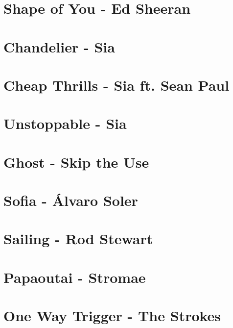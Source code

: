 \documentclass[11pt]{article}
\begin{document}
\section{Shape of You - Ed Sheeran}
\begin{guitar}

\end{guitar}



\section{Chandelier - Sia}
\begin{guitar}

\end{guitar}

\section{Cheap Thrills - Sia ft. Sean Paul}


\section{Unstoppable - Sia}
\begin{guitar}

\end{guitar}

\section{Ghost - Skip the Use}


\section{Sofia - Álvaro Soler}
\begin{guitar}

\end{guitar}

\section{Sailing - Rod Stewart}


\section{Papaoutai - Stromae}


\section{One Way Trigger - The Strokes}

\end{document}
